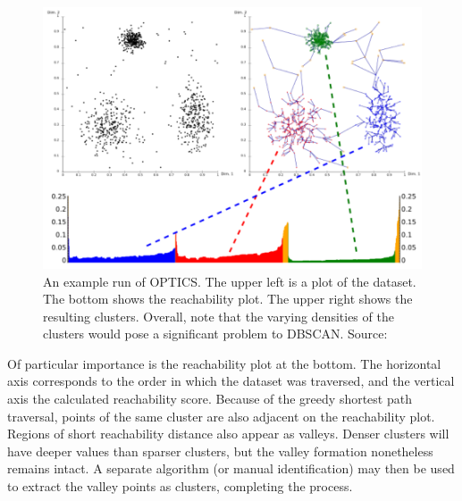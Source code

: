 \begin{figure}[h]
\centering
\includegraphics[scale=0.36]{chapter_2/files/optics_run.png}
\caption{An example run of OPTICS. The upper left is a plot of the dataset. The bottom shows the reachability plot. The upper right shows the resulting clusters. Overall, note that the varying densities of the clusters would pose a significant problem to DBSCAN. Source: \cite{wiki:optics}}
\label{fig:optics_plot}
\end{figure}

Of particular importance is the reachability plot at the bottom. The horizontal axis corresponds to the order in which the dataset was traversed, and the vertical axis the calculated reachability score. Because of the greedy shortest path traversal, points of the same cluster are also adjacent on the reachability plot. Regions of short reachability distance also appear as valleys. Denser clusters will have deeper values than sparser clusters, but the valley formation nonetheless remains intact. A separate algorithm (or manual identification) may then be used to extract the valley points as clusters, completing the process.
